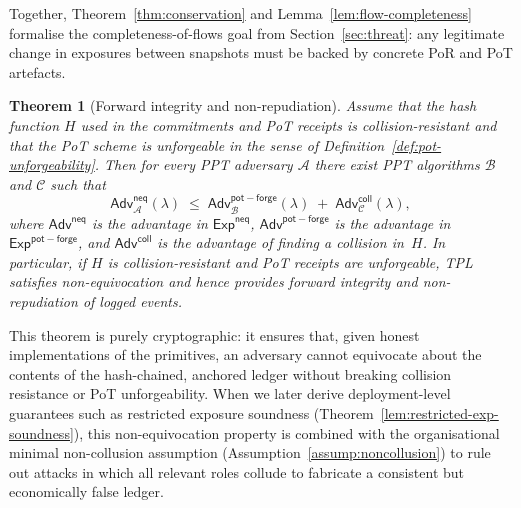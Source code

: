 \documentclass[11pt]{article}
\newtheorem{theorem}{Theorem}
\begin{document}
Together, Theorem~\ref{thm:conservation} and Lemma~\ref{lem:flow-completeness} formalise the
completeness-of-flows goal from Section~\ref{sec:threat}: any legitimate change in exposures between
snapshots must be backed by concrete PoR and PoT artefacts.
\begin{theorem}[Forward integrity and non-repudiation]
\label{thm:non-equivocation}
Assume that the hash function $H$ used in the commitments and PoT receipts is
collision-resistant and that the PoT scheme is unforgeable in the sense of
Definition~\ref{def:pot-unforgeability}.
Then for every PPT adversary $\mathcal{A}$ there exist PPT algorithms
$\mathcal{B}$ and $\mathcal{C}$ such that
\[
  \mathsf{Adv}^{\mathsf{neq}}_{\mathcal{A}}(\lambda)
  \;\leq\;
  \mathsf{Adv}^{\mathsf{pot-forge}}_{\mathcal{B}}(\lambda)
  \;+\;
  \mathsf{Adv}^{\mathsf{coll}}_{\mathcal{C}}(\lambda),
\]
where $\mathsf{Adv}^{\mathsf{neq}}$ is the advantage in
$\mathsf{Exp}^{\mathsf{neq}}$, $\mathsf{Adv}^{\mathsf{pot-forge}}$ is the
advantage in $\mathsf{Exp}^{\mathsf{pot-forge}}$, and
$\mathsf{Adv}^{\mathsf{coll}}$ is the advantage of finding a collision in~$H$.
In particular, if $H$ is collision-resistant and PoT receipts are unforgeable,
TPL satisfies non-equivocation and hence provides forward integrity and
non-repudiation of logged events.
\end{theorem}
\noindent
This theorem is purely cryptographic: it ensures that, given honest implementations of the primitives, an adversary cannot equivocate about the contents of the hash-chained, anchored ledger without breaking collision resistance or PoT unforgeability.
When we later derive deployment-level guarantees such as restricted exposure soundness (Theorem~\ref{lem:restricted-exp-soundness}), this non-equivocation property is combined with the organisational minimal non-collusion assumption (Assumption~\ref{assump:noncollusion}) to rule out attacks in which all relevant roles collude to fabricate a consistent but economically false ledger.
\end{document}
